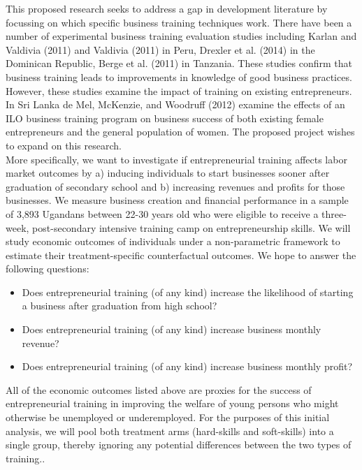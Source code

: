 \documentclass[oneside, notitlepage]{book}
\begin{document}
This proposed research seeks to address a gap in development literature by focussing on which specific business training techniques work. There have been a number of experimental business training evaluation studies including Karlan and Valdivia (2011)\cite{karlanAndValdivia2011} and Valdivia (2011)\cite{valdivia2011} in Peru, Drexler et al. (2014)\cite{drexler2014} in the Dominican Republic, Berge et al. (2011)\cite{berge2011} in Tanzania. These studies confirm that business training leads to improvements in knowledge of good business practices. However, these studies examine the impact of training on existing entrepreneurs. In Sri Lanka de Mel, McKenzie, and Woodruff (2012)\cite{deMelEtAl2012} examine the effects of an ILO business training program on business success of both existing female entrepreneurs and the general population of women. The proposed project wishes to expand on this research. \\

More specifically, we want to investigate if entrepreneurial training affects labor market outcomes by a) inducing individuals to start businesses sooner after graduation of secondary school and b) increasing revenues and profits for those businesses. We measure business creation and financial performance in a sample of 3,893 Ugandans between 22-30 years old who were eligible to receive a three-week, post-secondary intensive training camp on entrepreneurship skills. We will study economic outcomes of individuals under a non-parametric framework to estimate their treatment-specific counterfactual outcomes. We hope to answer the following questions:\\

\begin{itemize}
\item Does entrepreneurial training (of any kind) increase the likelihood of starting a business after graduation from high school?
\item Does entrepreneurial training (of any kind) increase business monthly revenue?
\item Does entrepreneurial training (of any kind) increase business monthly profit?
\end{itemize}

All of the economic outcomes listed above are proxies for the success of entrepreneurial training in improving the welfare of young persons who might otherwise be unemployed or underemployed. For the purposes of this initial analysis, we will pool both treatment arms (hard-skills and soft-skills) into a single group, thereby ignoring any potential differences between the two types of training..\\
\end{document}
